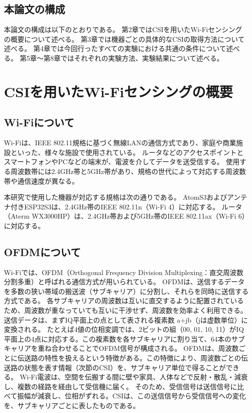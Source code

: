 \documentclass[uplatex, 12pt]{ujbook}
\begin{document}
\section{本論文の構成}
本論文の構成は以下のとおりである。
第2章ではCSIを用いたWi-Fiセンシングの概要について述べる。
第3章では機器ごとの具体的なCSIの取得方法について述べる。
第4章では今回行ったすべての実験における共通の条件について述べる。
第5章～第8章ではそれぞれの実験方法、実験結果について述べる。

\chapter{CSIを用いたWi-Fiセンシングの概要}
\section{Wi-Fiについて}
Wi-Fiは、IEEE 802.11規格に基づく無線LANの通信方式であり、家庭や商業施設といった、様々な施設で使用されている。
ルータなどのアクセスポイントとスマートフォンやPCなどの端末が、電波を介してデータを送受信する。
使用する周波数帯には2.4GHz帯と5GHz帯があり、規格の世代によって対応する周波数帯や通信速度が異なる。

本研究で使用した機器が対応する規格は次の通りである。
AtomS3およびアンテナ付きESP32S3は、2.4GHz帯のIEEE 802.11n（Wi-Fi 4）に対応する。
ルータ（Aterm WX3000HP）は、2.4GHz帯および5GHz帯のIEEE 802.11ax（Wi-Fi 6）に対応する。
\section{OFDMについて}
Wi-Fiでは、OFDM（Orthogonal Frequency Division Multiplexing：直交周波数分割多重）と呼ばれる通信方式が用いられている。
OFDMは、送信するデータを多数の狭い帯域の搬送波（サブキャリア）に分割し、それらを同時に送信する方式である。
各サブキャリアの周波数は互いに直交するように配置されているため、周波数が重なっていても互いに干渉せず、周波数を効率よく利用できる。
送信データは、まずIQ平面上の点として表される複素数 a+jb（jは虚数単位）に変換される。
たとえば4値の位相変調では、2ビットの組（00, 01, 10, 11）がIQ平面上の4点に対応する。この複素数を各サブキャリアに割り当て、64本のサブキャリアを重ね合わせることでOFDM信号が構成される。\cite{OFDM}
OFDMは、周波数ごとに伝送路の特性を扱えるという特徴がある。この特徴により、周波数ごとの伝送路の状態を表す情報（次節のCSI）を、サブキャリア単位で得ることができる。
Wi-Fi電波は、空間を伝搬する間に壁や家具、人体などで反射・散乱・減衰し、複数の経路を経由して受信機に届く。
そのため、受信信号は送信信号に比べて振幅が減衰し、位相がずれる。CSIは、この送信信号から受信信号への変化を、サブキャリアごとに表したものである。
\end{document}
